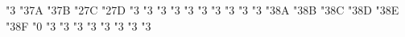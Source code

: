 {  \mathchardef\Perp                 "3\hex{}
  \mathchardef\leadstoext           "3\hex\txsycfam 7A
  \mathchardef\leadsto              "3\hex\txsycfam 7B
  \mathchardef\sqcupplus            "2\hex\txsycfam 7C
  \mathchardef\sqcapplus            "2\hex\txsycfam 7D
  \edef\llbracket{\delimiter "4\hex\txsycfam 7E\hex\txexafam 12 }%
  \edef\rrbracket{\delimiter "5\hex\txsycfam 7F\hex\txexafam 13 }%
  \mathchardef\boxright             "3\hex{}
  \mathchardef\boxleft              "3\hex{}
  \mathchardef\boxdotright          "3\hex{}
  \mathchardef\boxdotleft           "3\hex{}
  \mathchardef\Diamondright         "3\hex{}
  \mathchardef\Diamondleft          "3\hex{}
  \mathchardef\Diamonddotright      "3\hex{}
  \mathchardef\Diamonddotleft       "3\hex{}
  \mathchardef\boxRight             "3\hex{}
  \mathchardef\boxLeft              "3\hex{}
  \mathchardef\boxdotRight          "3\hex\txsycfam 8A
  \mathchardef\boxdotLeft           "3\hex\txsycfam 8B
  \mathchardef\DiamondRight         "3\hex\txsycfam 8C
  \mathchardef\DiamondLeft          "3\hex\txsycfam 8D
  \mathchardef\DiamonddotRight      "3\hex\txsycfam 8E
  \mathchardef\DiamonddotLeft       "3\hex\txsycfam 8F
  \mathchardef\Diamonddot           "0\hex{}
  \mathchardef\circleright          "3\hex{}
  \mathchardef\circleleft           "3\hex{}
  \mathchardef\circleddotright      "3\hex{}
  \let\circledotright\circleddotright
  \mathchardef\circleddotleft       "3\hex{}
  \let\circledotleft\circleddotleft
  \mathchardef\multimapbothvert     "3\hex{}
  \mathchardef\multimapdotbothvert  "3\hex{}
  \mathchardef\multimapdotbothBvert "3\hex{}
  \mathchardef\multimapdotbothAvert "3\hex{}
}
